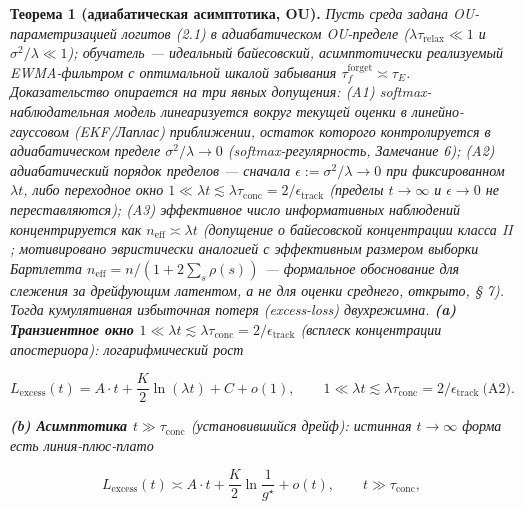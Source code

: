 \documentclass[12pt]{iopart}
\begin{document}
\textbf{Теорема 1 (адиабатическая асимптотика, OU).} \emph{Пусть среда задана OU-параметризацией логитов (2.1) в адиабатическом OU-пределе (\(\lambda\tau_{\text{relax}} \ll 1\) и \(\sigma^2/\lambda \ll 1\)); обучатель --- идеальный байесовский, асимптотически реализуемый EWMA-фильтром с оптимальной шкалой забывания \(\tau_f^{\text{forget}} \asymp \tau_E\). Доказательство опирается на три явных допущения: (A1) softmax-наблюдательная модель линеаризуется вокруг текущей оценки в линейно-гауссовом (EKF/Лаплас) приближении, остаток которого контролируется в адиабатическом пределе \(\sigma^2/\lambda \to 0\) (softmax-регулярность, \cite{Andriishin2026b} Замечание 6); (A2) адиабатический порядок пределов --- сначала \(\epsilon := \sigma^2/\lambda \to 0\) при фиксированном \(\lambda t\), либо переходное окно \(1 \ll \lambda t \lesssim \lambda\tau_{\text{conc}} = 2/\epsilon_{\text{track}}\) (пределы \(t\to\infty\) и \(\epsilon\to 0\) не переставляются); (A3) эффективное число информативных наблюдений концентрируется как \(n_{\text{eff}} \asymp \lambda t\) (допущение о байесовской концентрации класса II \cite{BialekNemenmanTishby2001}; \emph{мотивировано эвристически} аналогией с эффективным размером выборки Бартлетта \(n_{\text{eff}} = n/(1+2\sum_s\rho(s))\) \cite{Bartlett1946} --- формальное обоснование для \emph{слежения} за дрейфующим латентом, а не для оценки \emph{среднего}, открыто, § 7). Тогда кумулятивная избыточная потеря (excess-loss) двухрежимна. \textbf{(a) Транзиентное окно \(1\ll\lambda t\lesssim\lambda\tau_{\text{conc}} = 2/\epsilon_{\text{track}}\)} (всплеск концентрации апостериора): логарифмический рост}



\begin{equation}L_{\text{excess}}(t) = A\cdot t + \frac{K}{2}\ln(\lambda t) + C + o(1), \qquad 1\ll\lambda t\lesssim\lambda\tau_{\text{conc}} = 2/\epsilon_{\text{track}}\ \text{(A2)}. \tag{3.1}\end{equation}



\emph{\textbf{(b) Асимптотика \(t\gg\tau_{\text{conc}}\)} (установившийся дрейф): истинная \(t\to\infty\) форма есть линия-плюс-плато}



\begin{equation}L_{\text{excess}}(t) \asymp A\cdot t + \frac{K}{2}\ln\!\frac{1}{g^\star} + o(t), \qquad t\gg\tau_{\text{conc}}, \tag{3.1$'$}\end{equation}
\end{document}
